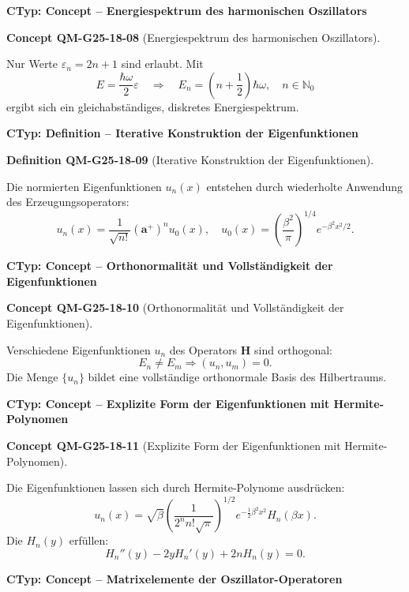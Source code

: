 \documentclass[10pt, letterpaper]{article}
\newcommand{\CustomHeading}[3]{%
  \par\medskip\noindent%
  \textbf{#1 #2} \textnormal{(#3)}.\enskip%
}
\newenvironment{DEF}[2]{\begin{unitbox}\CustomHeading{Definition}{#1}{#2}}{\end{unitbox}}
\newenvironment{CONC}[2]{\begin{unitbox}\CustomHeading{Concept}{#1}{#2}}{\end{unitbox}}
\begin{document}
\textbf{CTyp: Concept – Energiespektrum des harmonischen Oszillators}

\begin{CONC}{QM-G25-18-08}{Energiespektrum des harmonischen Oszillators}
Nur Werte $\varepsilon_n = 2n + 1$ sind erlaubt. Mit
\[
E = \frac{\hbar\omega}{2} \varepsilon \quad \Rightarrow \quad
E_n = \left( n + \frac{1}{2} \right) \hbar \omega, \quad n \in \mathbb{N}_0
\]
ergibt sich ein gleichabständiges, diskretes Energiespektrum.
\end{CONC}


\textbf{CTyp: Definition – Iterative Konstruktion der Eigenfunktionen}

\begin{DEF}{QM-G25-18-09}{Iterative Konstruktion der Eigenfunktionen}
Die normierten Eigenfunktionen $u_n(x)$ entstehen durch wiederholte Anwendung des Erzeugungsoperators:
\[
u_n(x) = \frac{1}{\sqrt{n!}} (\mathbf{a}^+)^n u_0(x), \quad u_0(x) = \left( \frac{\beta^2}{\pi} \right)^{1/4} e^{-\beta^2 x^2/2}.
\]
\end{DEF}



\textbf{CTyp: Concept – Orthonormalität und Vollständigkeit der Eigenfunktionen}

\begin{CONC}{QM-G25-18-10}{Orthonormalität und Vollständigkeit der Eigenfunktionen}
Verschiedene Eigenfunktionen $u_n$ des Operators $\mathbf{H}$ sind orthogonal:
\[
E_n \neq E_m \Rightarrow (u_n, u_m) = 0.
\]
Die Menge $\{u_n\}$ bildet eine vollständige orthonormale Basis des Hilbertraums.
\end{CONC}



\textbf{CTyp: Concept – Explizite Form der Eigenfunktionen mit Hermite-Polynomen}

\begin{CONC}{QM-G25-18-11}{Explizite Form der Eigenfunktionen mit Hermite-Polynomen}
Die Eigenfunktionen lassen sich durch Hermite-Polynome ausdrücken:
\[
u_n(x) = \sqrt{\beta} \left( \frac{1}{2^n n! \sqrt{\pi}} \right)^{1/2} e^{-\frac{1}{2} \beta^2 x^2} H_n(\beta x).
\]
Die $H_n(y)$ erfüllen:
\[
H_n''(y) - 2y H_n'(y) + 2n H_n(y) = 0.
\]
\end{CONC}


\textbf{CTyp: Concept – Matrixelemente der Oszillator-Operatoren}
\end{document}
